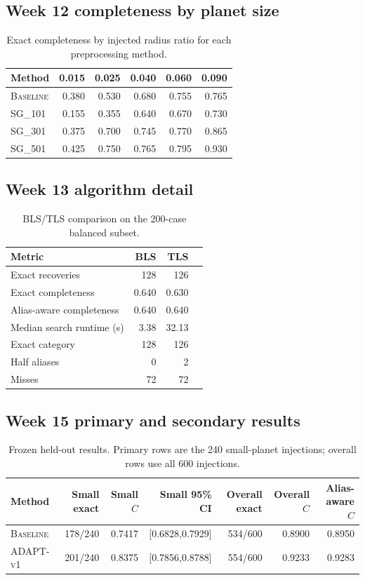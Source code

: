 \documentclass[11pt]{article}
\newcommand{\adapt}{\textsc{ADAPT-v1}}
\newcommand{\sg}[1]{\textsc{SG\_#1}}
\newcommand{\baseline}{\textsc{Baseline}}
\begin{document}
\subsection{Week 12 completeness by planet size}
\begin{table}[htbp]
\centering
\caption{Exact completeness by injected radius ratio for each preprocessing method.}
\small
\begin{tabular}{lrrrrr}
\toprule
Method & 0.015 & 0.025 & 0.040 & 0.060 & 0.090\\
\midrule
\baseline & 0.380 & 0.530 & 0.680 & 0.755 & 0.765\\
\sg{101} & 0.155 & 0.355 & 0.640 & 0.670 & 0.730\\
\sg{301} & 0.375 & 0.700 & 0.745 & 0.770 & 0.865\\
\sg{501} & 0.425 & 0.750 & 0.765 & 0.795 & 0.930\\
\bottomrule
\end{tabular}
\end{table}

\subsection{Week 13 algorithm detail}
\begin{table}[htbp]
\centering
\caption{BLS/TLS comparison on the 200-case balanced subset.}
\small
\begin{tabular}{lrrr}
\toprule
Metric & BLS & TLS\\
\midrule
Exact recoveries & 128 & 126\\
Exact completeness & 0.640 & 0.630\\
Alias-aware completeness & 0.640 & 0.640\\
Median search runtime (s) & 3.38 & 32.13\\
Exact category & 128 & 126\\
Half aliases & 0 & 2\\
Misses & 72 & 72\\
\bottomrule
\end{tabular}
\end{table}

\subsection{Week 15 primary and secondary results}
\begin{table}[htbp]
\centering
\caption{Frozen held-out results. Primary rows are the 240 small-planet injections; overall rows use all 600 injections.}
\small
\begin{tabular}{lrrrrrr}
\toprule
Method & Small exact & Small $C$ & Small 95\% CI & Overall exact & Overall $C$ & Alias-aware $C$\\
\midrule
\baseline & 178/240 & 0.7417 & [0.6828,0.7929] & 534/600 & 0.8900 & 0.8950\\
\adapt    & 201/240 & 0.8375 & [0.7856,0.8788] & 554/600 & 0.9233 & 0.9283\\
\bottomrule
\end{tabular}
\end{table}
\end{document}
